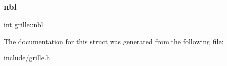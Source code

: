 \mbox{\label{structgrille_a0b4da1e205825df205b0c004d105d62a}} 
\subsubsection{\texorpdfstring{nbl}{nbl}}
{\footnotesize\ttfamily int grille\+::nbl}



The documentation for this struct was generated from the following file\+:\begin{DoxyCompactItemize}
\item 
include/\hyperlink{grille_8h}{grille.\+h}\end{DoxyCompactItemize}
